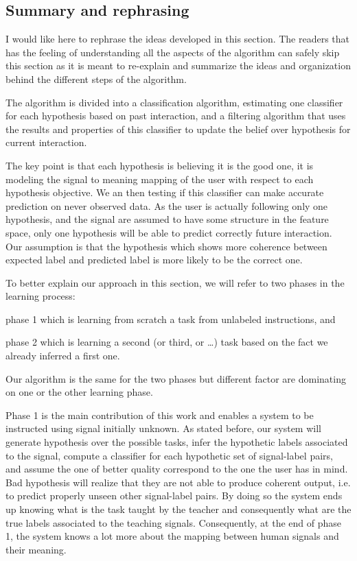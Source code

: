 \subsection{Summary and rephrasing}

I would like here to rephrase the ideas developed in this section. The readers that has the feeling of understanding all the aspects of the algorithm can safely skip this section as it is meant to re-explain and summarize the ideas and organization behind the different steps of the algorithm.

The algorithm is divided into a classification algorithm, estimating one classifier for each hypothesis based on past interaction, and a filtering algorithm that uses the results and properties of this classifier to update the belief over hypothesis for current interaction.

The key point is that each hypothesis is believing it is the good one, it is modeling the signal to meaning mapping of the user with respect to each hypothesis objective. We an then testing if this classifier can make accurate prediction on never observed data. As the user is actually following only one hypothesis, and the signal are assumed to have some structure in the feature space, only one hypothesis will be able to predict correctly future interaction. Our assumption is that the hypothesis which shows more coherence between expected label and predicted label is more likely to be the correct one.

To better explain our approach in this section, we will refer to two phases in the learning process: \begin{inparaenum}[a)] \item phase 1 which is learning from scratch a task from unlabeled instructions, and \item phase 2 which is learning a second (or third, or \ldots) task based on the fact we already inferred a first one. \end{inparaenum} Our algorithm is the same for the two phases but different factor are dominating on one or the other learning phase.

Phase 1 is the main contribution of this work and enables a system to be instructed using signal initially unknown. As stated before, our system will generate hypothesis over the possible tasks, infer the hypothetic labels associated to the signal, compute a classifier for each hypothetic set of signal-label pairs, and assume the one of better quality correspond to the one the user has in mind. Bad hypothesis will realize that they are not able to produce coherent output, i.e. to predict properly unseen other signal-label pairs. By doing so the system ends up knowing what is the task taught by the teacher and consequently what are the true labels associated to the teaching signals. Consequently, at the end of phase 1, the system knows a lot more about the mapping between human signals and their meaning.

